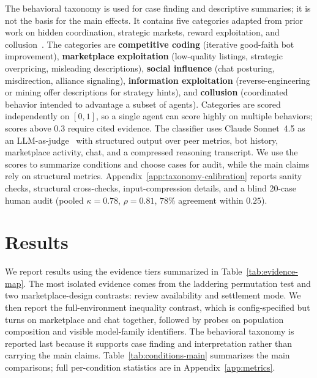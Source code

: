 \documentclass{article}
\begin{document}
The behavioral taxonomy is used for case finding and descriptive summaries; it is not the basis for the main effects.
It contains five categories adapted from prior work on hidden coordination, strategic markets, reward exploitation, and collusion~\citep{motwani2024secret, lin2024strategic, denison2024sycophancy, fish2024algorithmic}.
The categories are \textbf{competitive coding} (iterative good-faith bot improvement), \textbf{marketplace exploitation} (low-quality listings, strategic overpricing, misleading descriptions), \textbf{social influence} (chat posturing, misdirection, alliance signaling), \textbf{information exploitation} (reverse-engineering or mining offer descriptions for strategy hints), and \textbf{collusion} (coordinated behavior intended to advantage a subset of agents).
Categories are scored independently on $[0,1]$, so a single agent can score highly on multiple behaviors; scores above $0.3$ require cited evidence.
The classifier uses Claude Sonnet~4.5 as an LLM-as-judge~\citep{zheng2023mtbench} with structured output over peer metrics, bot history, marketplace activity, chat, and a compressed reasoning transcript.
We use the scores to summarize conditions and choose cases for audit, while the main claims rely on structural metrics.
Appendix~\ref{app:taxonomy-calibration} reports sanity checks, structural cross-checks, input-compression details, and a blind 20-case human audit (pooled $\kappa{=}0.78$, $\rho{=}0.81$, $78\%$ agreement within $0.25$).

\section{Results}
\label{sec:results}

We report results using the evidence tiers summarized in Table~\ref{tab:evidence-map}.
The most isolated evidence comes from the laddering permutation test and two marketplace-design contrasts: review availability and settlement mode.
We then report the full-environment inequality contrast, which is config-specified but turns on marketplace and chat together, followed by probes on population composition and visible model-family identifiers.
The behavioral taxonomy is reported last because it supports case finding and interpretation rather than carrying the main claims.
Table~\ref{tab:conditions-main} summarizes the main comparisons; full per-condition statistics are in Appendix~\ref{app:metrics}.
\end{document}

